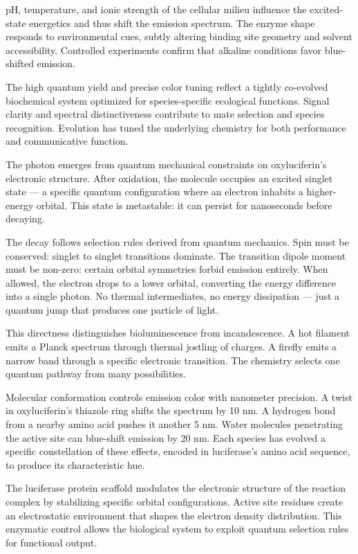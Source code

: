 pH, temperature, and ionic strength of the cellular milieu influence the excited-state energetics and thus shift the emission spectrum. The enzyme shape responds to environmental cues, subtly altering binding site geometry and solvent accessibility. Controlled experiments confirm that alkaline conditions favor blue-shifted emission.

The high quantum yield and precise color tuning reflect a tightly co-evolved biochemical system optimized for species-specific ecological functions. Signal clarity and spectral distinctiveness contribute to mate selection and species recognition. Evolution has tuned the underlying chemistry for both performance and communicative function.

The photon emerges from quantum mechanical constraints on oxyluciferin's electronic structure. After oxidation, the molecule occupies an excited singlet state — a specific quantum configuration where an electron inhabits a higher-energy orbital. This state is metastable: it can persist for nanoseconds before decaying.

The decay follows selection rules derived from quantum mechanics. Spin must be conserved: singlet to singlet transitions dominate. The transition dipole moment must be non-zero: certain orbital symmetries forbid emission entirely. When allowed, the electron drops to a lower orbital, converting the energy difference into a single photon. No thermal intermediates, no energy dissipation — just a quantum jump that produces one particle of light.

This directness distinguishes bioluminescence from incandescence. A hot filament emits a Planck spectrum through thermal jostling of charges. A firefly emits a narrow band through a specific electronic transition. The chemistry selects one quantum pathway from many possibilities.

Molecular conformation controls emission color with nanometer precision. A twist in oxyluciferin's thiazole ring shifts the spectrum by 10 nm. A hydrogen bond from a nearby amino acid pushes it another 5 nm. Water molecules penetrating the active site can blue-shift emission by 20 nm. Each species has evolved a specific constellation of these effects, encoded in luciferase's amino acid sequence, to produce its characteristic hue.

The luciferase protein scaffold modulates the electronic structure of the reaction complex by stabilizing specific orbital configurations. Active site residues create an electrostatic environment that shapes the electron density distribution. This enzymatic control allows the biological system to exploit quantum selection rules for functional output.

